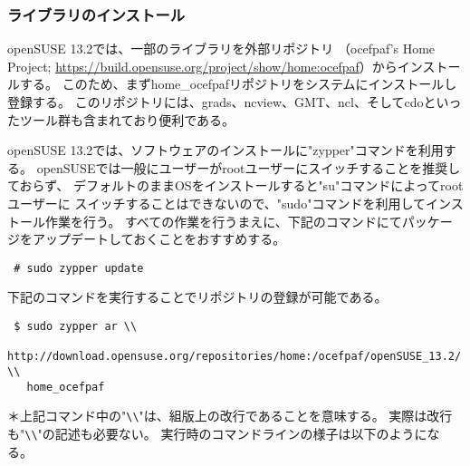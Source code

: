 \subsubsection{ライブラリのインストール}

openSUSE 13.2では、一部のライブラリを外部リポジトリ
（ocefpaf's Home Project; \url{https://build.opensuse.org/project/show/home:ocefpaf}）からインストールする。
このため、まずhome\_ocefpafリポジトリをシステムにインストールし登録する。
このリポジトリには、grads、ncview、GMT、ncl、そしてcdoといったツール群も含まれており便利である。

openSUSE 13.2では、ソフトウェアのインストールに"zypper"コマンドを利用する。
openSUSEでは一般にユーザーがrootユーザーにスイッチすることを推奨しておらず、
デフォルトのままOSをインストールすると"su"コマンドによってrootユーザーに
スイッチすることはできないので、"sudo"コマンドを利用してインストール作業を行う。
すべての作業を行うまえに、下記のコマンドにてパッケージをアップデートしておくことをおすすめする。
\begin{verbatim}
 # sudo zypper update
\end{verbatim}

下記のコマンドを実行することでリポジトリの登録が可能である。
\begin{verbatim}
 $ sudo zypper ar \\
   http://download.opensuse.org/repositories/home:/ocefpaf/openSUSE_13.2/ \\
   home_ocefpaf
\end{verbatim}
{\small ＊上記コマンド中の"\verb|\\|"は、組版上の改行であることを意味する。
実際は改行も"\verb|\\|"の記述も必要ない。}
実行時のコマンドラインの様子は以下のようになる。\\

\\

